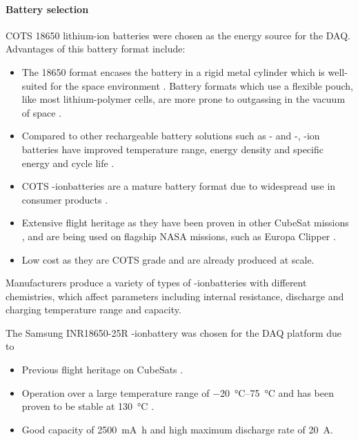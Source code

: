 \documentclass[a4paper,11pt]{article}
\newcommand{\liion}{\ce{Li}-ion}
\begin{document}
\paragraph{Battery selection}



COTS 18650 lithium-ion batteries were chosen as the energy source for the DAQ. Advantages of this battery format include:

\begin{itemize}
  \item The 18650 format encases the battery in a rigid metal cylinder which is well-suited for the space environment \cite{knap2020review}. Battery formats which use a flexible pouch, like most lithium-polymer cells, are more prone to outgassing in the vacuum of space \cite{knap2020review}.
  \item Compared to other rechargeable battery solutions such as - and -, -ion batteries have improved temperature range, energy density and specific energy and cycle life \cite{pathak2023review}.
  \item COTS \liion batteries are a mature battery format due to widespread use in consumer products \cite{pathak2023review}.
  \item Extensive flight heritage as they have been proven in other CubeSat missions \cite{knap2020review}, and are being used on flagship NASA missions, such as Europa Clipper \cite{krause2021performance}.
  \item Low cost as they are COTS grade and are already produced at scale. %
\end{itemize}

Manufacturers produce a variety of types of \liion batteries with different chemistries, which affect parameters including internal resistance, discharge and charging temperature range and capacity.

The Samsung INR18650-25R \liion battery was chosen for the DAQ platform due to
\begin{itemize}
  \item Previous flight heritage on CubeSats \cite{marcelino2021orbit}.
  \item Operation over a large temperature range of \SIrange{-20}{75}{\degreeCelsius} and has been proven to be stable at \SI{130}{\degreeCelsius} \cite{samsung2014}.
  \item Good capacity of \SI{2500}{\milli\ampere\hour} and high maximum discharge rate of \SI{20}{\ampere}.
\end{itemize}
\end{document}
